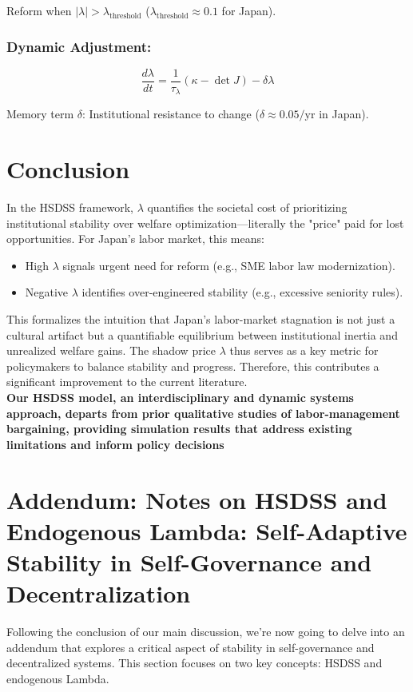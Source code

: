 \documentclass[10pt]{article}
\theoremstyle{definition}
\begin{document}
Reform when $|\lambda| > \lambda_{\text{threshold}}$ ($\lambda_{\text{threshold}} \approx 0.1$ for Japan).

\subsubsection{Dynamic Adjustment:}

\begin{equation}
\frac{d\lambda}{dt} = \frac{1}{\tau_\lambda} (\kappa - \det J) - \delta \lambda
\end{equation}

Memory term $\delta$: Institutional resistance to change ($\delta \approx 0.05/\text{yr}$ in Japan).

\section{Conclusion}

In the HSDSS framework, $\lambda$ quantifies the societal cost of prioritizing institutional stability over welfare optimization—literally the "price" paid for lost opportunities. For Japan’s labor market, this means:

\begin{itemize}
    \item High $\lambda$ signals urgent need for reform (e.g., SME labor law modernization).
    \item Negative $\lambda$ identifies over-engineered stability (e.g., excessive seniority rules).
\end{itemize}

This formalizes the intuition that Japan’s labor-market stagnation is not just a cultural artifact but a quantifiable equilibrium between institutional inertia and unrealized welfare gains. The shadow price $\lambda$ thus serves as a key metric for policymakers to balance stability and progress. Therefore, this contributes a significant improvement to the current literature.\\

\textbf{Our HSDSS model, an interdisciplinary and dynamic systems approach, departs from prior qualitative studies of labor-management bargaining, providing simulation results that address existing limitations and inform policy decisions}


\section{Addendum: Notes on HSDSS and Endogenous Lambda: Self-Adaptive Stability in Self-Governance and Decentralization}
Following the conclusion of our main discussion, we're now going to delve into an addendum that explores a critical aspect of stability in self-governance and decentralized systems. This section focuses on two key concepts: HSDSS and endogenous Lambda.
\end{document}
